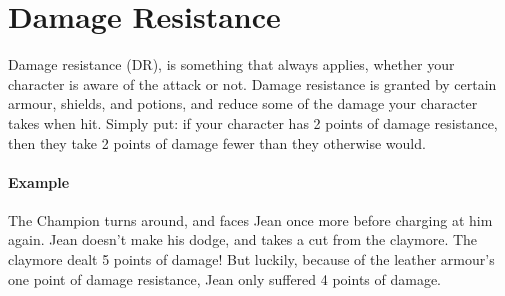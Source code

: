\section{Damage Resistance}
Damage resistance (DR), is something that always applies, whether your character is aware of the attack or not.
Damage resistance is granted by certain armour, shields, and potions, and reduce some of the damage your character takes when hit.
Simply put: if your character has 2 points of damage resistance, then they take 2 points of damage fewer than they otherwise would.

\paragraph{Example} The Champion turns around, and faces Jean once more before charging at him again.
Jean doesn't make his dodge, and takes a cut from the claymore.
The claymore dealt 5 points of damage!
But luckily, because of the leather armour's one point of damage resistance, Jean only suffered 4 points of damage.
